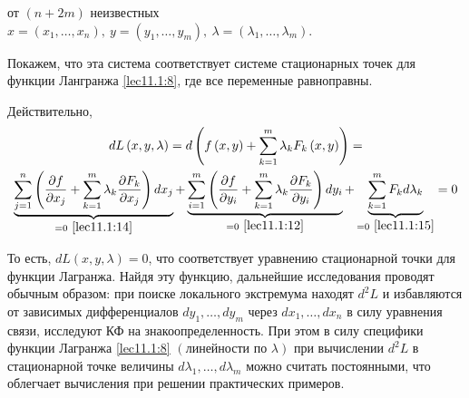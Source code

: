 \documentclass[../../main.tex]{subfiles}
\begin{document}
	от $ \left( n + 2m \right) $ неизвестных $x = \left( 
	x_1, \ldots, x_n \right),\ 
	y = \left( y_1, \ldots, y_m \right),\ \lambda = \left( \lambda_1,
	\ldots, \lambda_m \right) $.
	
	Покажем, что эта система соответствует системе стационарных точек для
	функции Лангранжа \eqref{lec11.1:8}, где все переменные равноправны.
	
	Действительно, 
	\begin{multline*}
	dL\left( x, y, \lambda \right) = d\left( f\left( x, y\right) 
	+ \sum\limits_{k=1}^{m}\lambda_k F_k\left( x, y \right) \right) =
	\\
	\underbrace{\sum\limits_{j=1}^{n}\left( 
	\dfrac{\partial f}{\partial x_j} 
	+ \sum\limits_{k=1}^{m}\lambda_k \dfrac{\partial F_k}
	{\partial x_j}  
	\right)d x_j}_{= 0\ \eqref{lec11.1:14}} + 
	\underbrace{\sum\limits_{i=1}^{m} \left( 
	\dfrac{\partial f}{\partial y_i} 
	+ \sum\limits_{k=1}^{m}\lambda_k \dfrac{\partial F_k}
	{\partial y_i}  \right) dy_i}_{= 0\ 
	\eqref{lec11.1:12}}
	+ \underbrace{\sum\limits_{k=1}^{m} F_k d \lambda_k}
	_{= 0\ \eqref{lec11.1:15}} = 0
	\end{multline*}
	
	То есть, $dL\left( x, y, \lambda \right) = 0$, что 
	соответствует уравнению 
	стационарной точки для функции Лагранжа. Найдя эту функцию, дальнейшие
	исследования проводят обычным образом: при поиске локального экстремума 
	находят $d^2L$ и избавляются от зависимых 
	дифференциалов $d y_1, \ldots, d y_m $ 
	через $d x_1, \ldots, d x_n$ в силу уравнения связи, исследуют КФ на 
	знакоопределенность. При этом в силу специфики функции 
	Лагранжа \eqref{lec11.1:8} 
	$\left( \text{линейности по } \lambda \right) $ при вычислении $d^2 L$
	в стационарной точке величины $d \lambda_1, \ldots, d \lambda_m$ можно
	считать постоянными, что облегчает вычисления при решении практических
	примеров.
	
\end{document}
